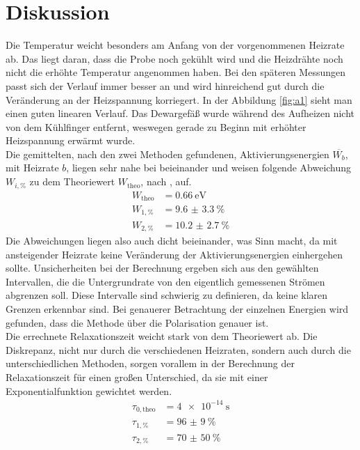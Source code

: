 \section{Diskussion}


Die Temperatur weicht besonders am Anfang von der vorgenommenen Heizrate ab. Das liegt daran, dass die Probe noch
gekühlt wird und die Heizdrähte noch nicht die erhöhte Temperatur angenommen haben. Bei den späteren Messungen passt sich der Verlauf immer besser an
und wird hinreichend gut durch die Veränderung an der Heizspannung korriegert. In der Abbildung \ref{fig:a1} sieht man einen guten linearen Verlauf.
Das Dewargefäß wurde während des Aufheizen nicht von dem Kühlfinger entfernt, weswegen gerade zu Beginn mit erhöhter Heizspannung erwärmt wurde.
\\
\newline
Die gemittelten, nach den zwei Methoden gefundenen, Aktivierungsenergien $\overline{W_{b}}$, mit Heizrate $b$,  liegen sehr nahe bei beieinander und weisen folgende Abweichung $W_{i,\%}$ zu dem Theoriewert $W_{\text{theo}}$, nach \cite{https://doi.org/10.1002/pssb.2220610223}, auf.
\begin{align*}
    W_{\text{theo}} &= \SI{0.66}{\electronvolt} \\
    W_{1,\%} &= \SI{9.6(33)}{\percent}  \\
    W_{2,\%} &= \SI{10.2(27)}{\percent}
\end{align*}
Die Abweichungen liegen also auch dicht beieinander, was Sinn macht, da mit ansteigender Heizrate keine Veränderung der Aktivierungsenergien einhergehen sollte.
Unsicherheiten bei der Berechnung ergeben sich aus den gewählten Intervallen, die die Untergrundrate von den eigentlich gemessenen Strömen abgrenzen soll.
Diese Intervalle sind schwierig zu definieren, da keine klaren Grenzen erkennbar sind.
Bei genauerer Betrachtung der einzelnen Energien wird gefunden, dass die Methode über die Polarisation genauer ist.
\\
\newline
Die errechnete Relaxationszeit weicht stark von dem Theoriewert ab.  
Die Diskrepanz, nicht nur durch die verschiedenen Heizraten, sondern auch durch die unterschiedlichen Methoden, sorgen vorallem 
in der Berechnung der Relaxationszeit für einen großen Unterschied, da sie mit einer Exponentialfunktion gewichtet werden.
\begin{align*}
    \tau_{0,\text{theo}} &= \SI{4e-14}{\second} \\
    \tau_{1,\%} &= \SI{96(9)}{\percent}  \\
    \tau_{2,\%} &= \SI{70(50)}{\percent}
\end{align*}
